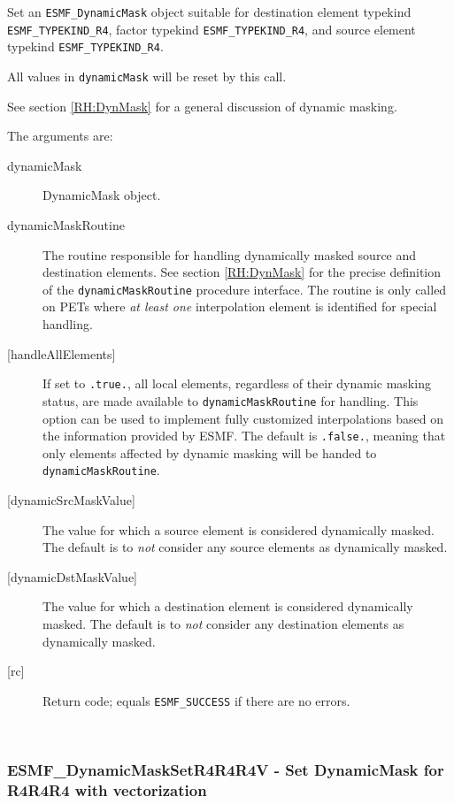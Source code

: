      \label{api:DynamicMaskSetR8R8R8}
     Set an {\tt ESMF\_DynamicMask} object suitable for 
     destination element typekind {\tt ESMF\_TYPEKIND\_R4},
     factor typekind {\tt ESMF\_TYPEKIND\_R4}, and
     source element typekind {\tt ESMF\_TYPEKIND\_R4}.
     
     All values in {\tt dynamicMask} will be reset by this call.
  
     See section \ref{RH:DynMask} for a general discussion of dynamic masking.
  
     The arguments are:
     \begin{description}
     \item[dynamicMask] 
       DynamicMask object.
     \item [dynamicMaskRoutine]
       The routine responsible for handling dynamically masked source and 
       destination elements. See section \ref{RH:DynMask} for the precise
       definition of the {\tt dynamicMaskRoutine} procedure interface.
       The routine is only called on PETs where {\em at least one} interpolation 
       element is identified for special handling.
     \item [{[handleAllElements]}]
       If set to {\tt .true.}, all local elements, regardless of their dynamic
       masking status, are made available to {\tt dynamicMaskRoutine} for
       handling. This option can be used to implement fully customized
       interpolations based on the information provided by ESMF.
       The default is {\tt .false.}, meaning that only elements affected by
       dynamic masking will be handed to {\tt dynamicMaskRoutine}.
     \item [{[dynamicSrcMaskValue]}]
       The value for which a source element is considered dynamically
       masked.
       The default is to {\em not} consider any source elements as
       dynamically masked.
     \item [{[dynamicDstMaskValue]}]
       The value for which a destination element is considered dynamically
       masked.
       The default is to {\em not} consider any destination elements as
       dynamically masked.
     \item[{[rc]}] 
       Return code; equals {\tt ESMF\_SUCCESS} if there are no errors.
     \end{description}
   
 
\mbox{}\hrulefill\ 
 
\subsubsection [ESMF\_DynamicMaskSetR4R4R4V] {ESMF\_DynamicMaskSetR4R4R4V - Set DynamicMask for R4R4R4 with vectorization}


